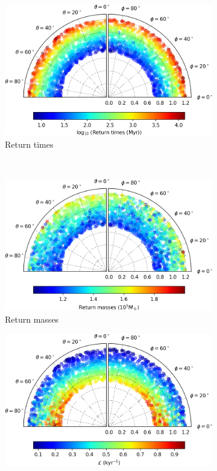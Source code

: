 \begin{figure}[h]
    \centering
    \begin{subfigure}[t]{0.4\textwidth}
        \includegraphics[width = \textwidth]{"../Files/Week 13/images/21_time"}
        \caption{Return times}
    \end{subfigure}
    ~ 
    \begin{subfigure}[t]{0.4\textwidth}
        \includegraphics[width=\textwidth]{"../Files/Week 13/images/21_mass"}
        \caption{Return masses}
    \end{subfigure}
    \begin{subfigure}[t]{0.4\textwidth}
        \includegraphics[width=\textwidth]{"../Files/Week 13/images/21_lyapunov"}

\end{subfigure}
\end{figure}
